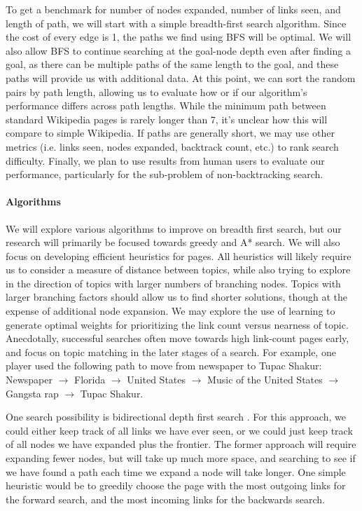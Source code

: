 \documentclass[11pt]{article}
\begin{document}
To get a benchmark for number of nodes expanded, number of links seen, and length of path, we will start with a simple breadth-first search algorithm.  Since the cost of every edge is 1, the paths we find using BFS will be optimal. We will also allow BFS to continue searching at the goal-node depth even after finding a goal, as there can be multiple paths of the same length to the goal, and these paths will provide us with additional data.  At this point, we can sort the random pairs by path length, allowing us to evaluate how or if our algorithm's performance differs across path lengths. While the minimum path between standard Wikipedia pages is rarely longer than 7, it's unclear how this will compare to simple Wikipedia. If paths are generally short, we may use other metrics (i.e. links seen, nodes expanded, backtrack count, etc.) to rank search difficulty. Finally, we plan to use results from human users \cite{wikigame}to evaluate our performance, particularly for the sub-problem of non-backtracking search. 

\paragraph{Algorithms}
We will explore various algorithms to improve on breadth first search, but our research will primarily be focused towards greedy and A* search. We will also focus on developing efficient heuristics for pages. All heuristics will likely require us to consider a measure of distance between topics, while also trying to explore in the direction of topics with larger numbers of branching nodes. Topics with larger branching factors should allow us to find shorter solutions, though at the expense of additional node expansion. We may explore the use of learning to generate optimal weights for prioritizing the link count versus nearness of topic. Anecdotally, successful searches often move towards high link-count pages early, and focus on topic matching in the later stages of a search. For example, one player used the following path to move from newspaper to Tupac Shakur: Newspaper $\rightarrow$ Florida $\rightarrow$ United States $\rightarrow$ Music of the United States $\rightarrow$ Gangsta rap $\rightarrow$ Tupac Shakur. 

One search possibility is bidirectional depth first search \cite{princeton}. For this approach, we could either keep track of all links we have ever seen, or we could just keep track of all nodes we have expanded plus the frontier.  The former approach will require expanding fewer nodes, but will take up much more space, and searching to see if we have found a path each time we expand a node will take longer. One simple heuristic would be to greedily choose the page with the most outgoing links for the forward search, and the most incoming links for the backwards search.
\end{document}
